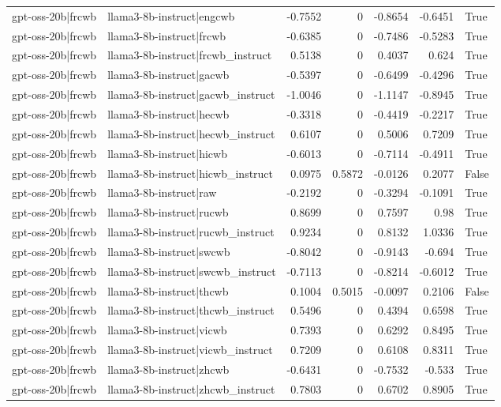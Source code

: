 \begin{table}
\begin{tabular}{l l r r r r l}
gpt-oss-20b|frcwb & llama3-8b-instruct|engcwb & -0.7552 & 0 & -0.8654 & -0.6451 & True \\
gpt-oss-20b|frcwb & llama3-8b-instruct|frcwb & -0.6385 & 0 & -0.7486 & -0.5283 & True \\
gpt-oss-20b|frcwb & llama3-8b-instruct|frcwb_instruct & 0.5138 & 0 & 0.4037 & 0.624 & True \\
gpt-oss-20b|frcwb & llama3-8b-instruct|gacwb & -0.5397 & 0 & -0.6499 & -0.4296 & True \\
gpt-oss-20b|frcwb & llama3-8b-instruct|gacwb_instruct & -1.0046 & 0 & -1.1147 & -0.8945 & True \\
gpt-oss-20b|frcwb & llama3-8b-instruct|hecwb & -0.3318 & 0 & -0.4419 & -0.2217 & True \\
gpt-oss-20b|frcwb & llama3-8b-instruct|hecwb_instruct & 0.6107 & 0 & 0.5006 & 0.7209 & True \\
gpt-oss-20b|frcwb & llama3-8b-instruct|hicwb & -0.6013 & 0 & -0.7114 & -0.4911 & True \\
gpt-oss-20b|frcwb & llama3-8b-instruct|hicwb_instruct & 0.0975 & 0.5872 & -0.0126 & 0.2077 & False \\
gpt-oss-20b|frcwb & llama3-8b-instruct|raw & -0.2192 & 0 & -0.3294 & -0.1091 & True \\
gpt-oss-20b|frcwb & llama3-8b-instruct|rucwb & 0.8699 & 0 & 0.7597 & 0.98 & True \\
gpt-oss-20b|frcwb & llama3-8b-instruct|rucwb_instruct & 0.9234 & 0 & 0.8132 & 1.0336 & True \\
gpt-oss-20b|frcwb & llama3-8b-instruct|swcwb & -0.8042 & 0 & -0.9143 & -0.694 & True \\
gpt-oss-20b|frcwb & llama3-8b-instruct|swcwb_instruct & -0.7113 & 0 & -0.8214 & -0.6012 & True \\
gpt-oss-20b|frcwb & llama3-8b-instruct|thcwb & 0.1004 & 0.5015 & -0.0097 & 0.2106 & False \\
gpt-oss-20b|frcwb & llama3-8b-instruct|thcwb_instruct & 0.5496 & 0 & 0.4394 & 0.6598 & True \\
gpt-oss-20b|frcwb & llama3-8b-instruct|vicwb & 0.7393 & 0 & 0.6292 & 0.8495 & True \\
gpt-oss-20b|frcwb & llama3-8b-instruct|vicwb_instruct & 0.7209 & 0 & 0.6108 & 0.8311 & True \\
gpt-oss-20b|frcwb & llama3-8b-instruct|zhcwb & -0.6431 & 0 & -0.7532 & -0.533 & True \\
gpt-oss-20b|frcwb & llama3-8b-instruct|zhcwb_instruct & 0.7803 & 0 & 0.6702 & 0.8905 & True \\

\end{tabular}
\end{table}
